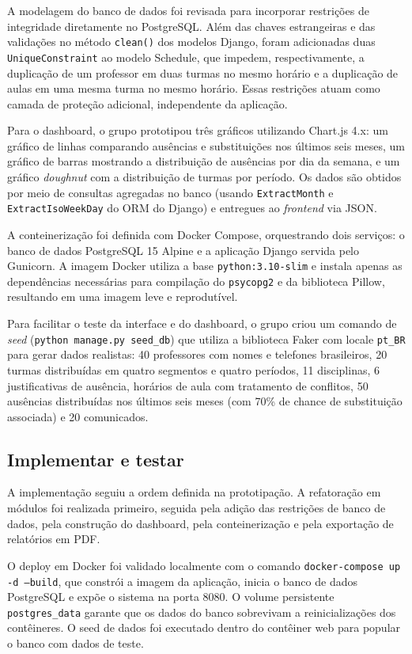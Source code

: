 A modelagem do banco de dados foi revisada para incorporar restrições de integridade diretamente no PostgreSQL. Além das chaves estrangeiras e das validações no método \texttt{clean()} dos modelos Django, foram adicionadas duas \texttt{UniqueConstraint} ao modelo Schedule, que impedem, respectivamente, a duplicação de um professor em duas turmas no mesmo horário e a duplicação de aulas em uma mesma turma no mesmo horário. Essas restrições atuam como camada de proteção adicional, independente da aplicação.

Para o dashboard, o grupo prototipou três gráficos utilizando Chart.js 4.x: um gráfico de linhas comparando ausências e substituições nos últimos seis meses, um gráfico de barras mostrando a distribuição de ausências por dia da semana, e um gráfico \textit{doughnut} com a distribuição de turmas por período. Os dados são obtidos por meio de consultas agregadas no banco (usando \texttt{ExtractMonth} e \texttt{ExtractIsoWeekDay} do ORM do Django) e entregues ao \textit{frontend} via JSON.

A conteinerização foi definida com Docker Compose, orquestrando dois serviços: o banco de dados PostgreSQL 15 Alpine e a aplicação Django servida pelo Gunicorn. A imagem Docker utiliza a base \texttt{python:3.10-slim} e instala apenas as dependências necessárias para compilação do \texttt{psycopg2} e da biblioteca Pillow, resultando em uma imagem leve e reprodutível.

Para facilitar o teste da interface e do dashboard, o grupo criou um comando de \textit{seed} (\texttt{python manage.py seed\_db}) que utiliza a biblioteca Faker com locale \texttt{pt\_BR} para gerar dados realistas: 40 professores com nomes e telefones brasileiros, 20 turmas distribuídas em quatro segmentos e quatro períodos, 11 disciplinas, 6 justificativas de ausência, horários de aula com tratamento de conflitos, 50 ausências distribuídas nos últimos seis meses (com 70\% de chance de substituição associada) e 20 comunicados.

\subsection{Implementar e testar}

A implementação seguiu a ordem definida na prototipação. A refatoração em módulos foi realizada primeiro, seguida pela adição das restrições de banco de dados, pela construção do dashboard, pela conteinerização e pela exportação de relatórios em PDF.

O deploy em Docker foi validado localmente com o comando \texttt{docker-compose up -d --build}, que constrói a imagem da aplicação, inicia o banco de dados PostgreSQL e expõe o sistema na porta 8080. O volume persistente \texttt{postgres\_data} garante que os dados do banco sobrevivam a reinicializações dos contêineres. O seed de dados foi executado dentro do contêiner web para popular o banco com dados de teste.

